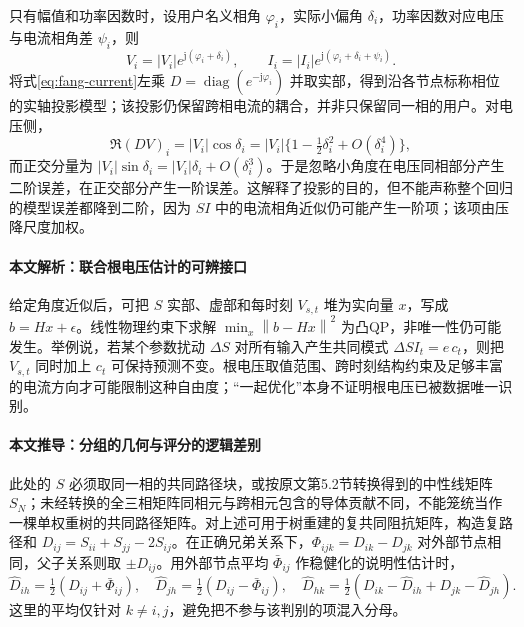 \documentclass[UTF8,11pt,fontset=fandol]{ctexart}
\DeclareMathOperator{\diag}{diag}
\newcommand{\norm}[1]{\left\lVert#1\right\rVert}
\theoremstyle{remark}
\numberwithin{equation}{section}
\begin{document}
只有幅值和功率因数时，设用户名义相角 $\varphi_i$，实际小偏角 $\delta_i$，功率因数对应电压与电流相角差 $\psi_i$，则
\begin{equation}
 V_i=|V_i|e^{\mathrm j(\varphi_i+\delta_i)},\qquad
 I_i=|I_i|e^{\mathrm j(\varphi_i+\delta_i+\psi_i)}.
\end{equation}
将式\eqref{eq:fang-current}左乘 $D=\diag(e^{-\mathrm j\varphi_i})$ 并取实部，得到沿各节点标称相位的实轴投影模型；该投影仍保留跨相电流的耦合，并非只保留同一相的用户。对电压侧，
\begin{equation}
 \Re(DV)_i=|V_i|\cos\delta_i
 =|V_i|\{1-\tfrac12\delta_i^2+O(\delta_i^4)\},
\end{equation}
而正交分量为 $|V_i|\sin\delta_i=|V_i|\delta_i+O(\delta_i^3)$。于是忽略小角度在电压同相部分产生二阶误差，在正交部分产生一阶误差。这解释了投影的目的，但不能声称整个回归的模型误差都降到二阶，因为 $SI$ 中的电流相角近似仍可能产生一阶项；该项由压降尺度加权。

\paragraph{本文解析：联合根电压估计的可辨接口}
给定角度近似后，可把 $S$ 实部、虚部和每时刻 $V_{s,t}$ 堆为实向量 $x$，写成 $b=Hx+\epsilon$。线性物理约束下求解 $\min_x\norm{b-Hx}^2$ 为凸QP，非唯一性仍可能发生。举例说，若某个参数扰动 $\Delta S$ 对所有输入产生共同模式 $\Delta S I_t=e\,c_t$，则把 $V_{s,t}$ 同时加上 $c_t$ 可保持预测不变。根电压取值范围、跨时刻结构约束及足够丰富的电流方向才可能限制这种自由度；“一起优化”本身不证明根电压已被数据唯一识别。

\paragraph{本文推导：分组的几何与评分的逻辑差别}
此处的 $S$ 必须取同一相的共同路径块，或按原文第5.2节转换得到的中性线矩阵 $S_N$；未经转换的全三相矩阵同相元与跨相元包含的导体贡献不同，不能笼统当作一棵单权重树的共同路径矩阵。对上述可用于树重建的复共同阻抗矩阵，构造复路径和 $D_{ij}=S_{ii}+S_{jj}-2S_{ij}$。在正确兄弟关系下，$\Phi_{ijk}=D_{ik}-D_{jk}$ 对外部节点相同，父子关系则取 $\pm D_{ij}$。用外部节点平均 $\bar\Phi_{ij}$ 作稳健化的说明性估计时，
\begin{equation}
 \widehat D_{ih}=\tfrac12(D_{ij}+\bar\Phi_{ij}),\quad
 \widehat D_{jh}=\tfrac12(D_{ij}-\bar\Phi_{ij}),\quad
 \widehat D_{hk}=\tfrac12(D_{ik}-\widehat D_{ih}+D_{jk}-\widehat D_{jh}).
\end{equation}
这里的平均仅针对 $k\ne i,j$，避免把不参与该判别的项混入分母。
\end{document}
